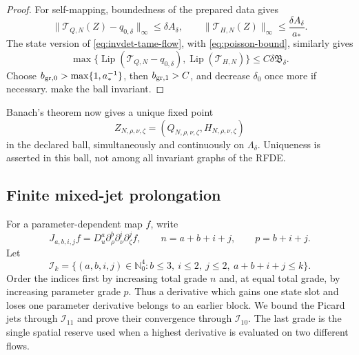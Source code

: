 \begin{proof}
For self-mapping, boundedness of the prepared data gives
\begin{equation}
 \|\mathcal T_{Q,N}(Z)-q_{0,\delta}\|_\infty
 \leq\delta A_\delta,
 \qquad
 \|\mathcal T_{H,N}(Z)\|_\infty
 \leq\frac{\delta A_\delta}{a_*}.                    \label{eq:invdet-transform-size}
\end{equation}
The state version of \cref{eq:invdet-tame-flow}, with
\cref{eq:poisson-bound}, similarly gives
\begin{equation}
 \max\{\operatorname{Lip}(\mathcal T_{Q,N}-q_{0,\delta}),
          \operatorname{Lip}(\mathcal T_{H,N})\}
 \leq C\delta\mathfrak B_\delta.                    \label{eq:invdet-transform-Lipschitz}
\end{equation}
Choose \(b_{\rm gr,0}>\max\{1,a_*^{-1}\}\), then
\(b_{\rm gr,1}>C\), and decrease
\(\delta_0\) once more if necessary.
 make the ball
invariant.
\end{proof}

Banach's theorem now gives a unique fixed point
\begin{equation}
 Z_{N,\rho,\nu,\zeta}=(Q_{N,\rho,\nu,\zeta},
                       H_{N,\rho,\nu,\zeta})          \label{eq:invdet-fixed-graph}
\end{equation}
in the declared ball, simultaneously and continuously on
\(\Lambda_\delta\).  Uniqueness is asserted in this ball, not among all
invariant graphs of the RFDE.

\subsection{Finite mixed-jet prolongation}

For a parameter-dependent map \(f\), write
\begin{equation}
 J_{a,b,i,j}f
 =D_u^a\partial_\rho^b\partial_\nu^i\partial_\zeta^jf,
 \qquad n=a+b+i+j,
 \qquad p=b+i+j.                                     \label{eq:invdet-jet-notation}
\end{equation}
Let
\begin{equation}
 \mathcal I_k=\{(a,b,i,j)\in\mathbb N_0^4:
 b\leq3,\ i\leq2,\ j\leq2,\ a+b+i+j\leq k\}.     \label{eq:invdet-index-set}
\end{equation}
Order the indices first by increasing total grade \(n\) and, at equal
total grade, by increasing parameter grade \(p\).  Thus a derivative which
gains one state slot and loses one parameter derivative belongs to an
earlier block.  We bound the Picard jets through \(\mathcal I_{11}\) and
prove their convergence through \(\mathcal I_{10}\).  The last grade is
the single spatial reserve used when a highest derivative is evaluated on
two different flows.


